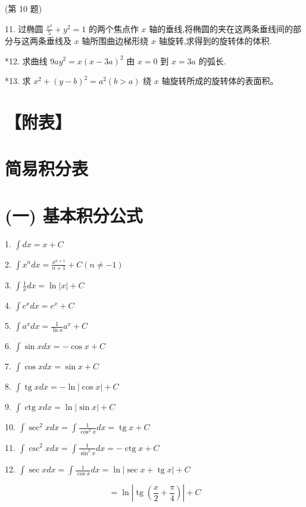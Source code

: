 \documentclass[lang=cn,newtx,10pt,scheme=chinese]{elegantbook}
\begin{document}
(第 10 题)

11. 过椭圆 \(\frac{{x}^{2}}{5} + {y}^{2} = 1\) 的两个焦点作 \(x\) 轴的垂线,将椭圆的夹在这两条垂线间的部分与这两条垂线及 \(x\) 轴所围曲边梯形绕 \(x\) 轴旋转,求得到的旋转体的体积.

*12. 求曲线 \({9a}{y}^{2} = x{\left( x - 3a\right) }^{2}\) 由 \(x = 0\) 到 \(x = {3a}\) 的弧长.

*13. 求 \({x}^{2} + {\left( y - b\right) }^{2} = {a}^{2}\left( {b > a}\right)\) 绕 \(x\) 轴旋转所成的旋转体的表面积。

\section*{【附表】}

\section*{简易积分表}

\section*{(一) 基本积分公式}

1. \(\int {dx} = x + C\)

2. \(\int {x}^{n}{dx} = \frac{{x}^{n + 1}}{n + 1} + C\left( {n \neq - 1}\right)\)

3. \(\int \frac{1}{x}{dx} = \ln \left| x\right| + C\)

4. \(\int {e}^{x}{dx} = {e}^{x} + C\)

5. \(\int {a}^{x}{dx} = \frac{1}{\ln a}{a}^{x} + C\)

6. \(\int \sin {xdx} = - \cos x + C\)

7. \(\int \cos {xdx} = \sin x + C\)

8. \(\int \operatorname{tg}{xdx} = - \ln \left| {\cos x}\right| + C\)

9. \(\int \operatorname{ctg}{xdx} = \ln \left| {\sin x}\right| + C\)

10. \(\int {\sec }^{2}{xdx} = \int \frac{1}{{\cos }^{2}x}{dx} = \operatorname{tg}x + C\)

11. \(\int {\csc }^{2}{xdx} = \int \frac{1}{{\sin }^{2}x}{dx} = - \operatorname{ctg}x + C\)

12. \(\int \sec {xdx} = \int \frac{1}{\cos x}{dx} = \ln \left| {\sec x + \operatorname{tg}x}\right| + C\)

\[
= \ln \left| {\operatorname{tg}\left( {\frac{x}{2} + \frac{\pi }{4}}\right) }\right| + C
\]
\end{document}
